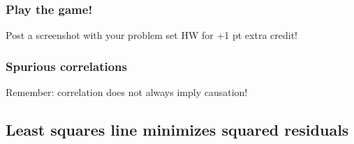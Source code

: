 \documentclass[11pt,containsverbatim,handout,xcolor=xelatex,dvipsnames,table]{beamer}
\begin{document}

\begin{frame}
\frametitle{Play the game!}

\vfill

Post a screenshot with your problem set HW for +1 pt extra credit!


\vfill

\end{frame}


\begin{frame}
\frametitle{Spurious correlations}

\vfill

Remember: correlation does not always imply causation!


\vfill

\end{frame}


\subsection{Least squares line minimizes squared residuals}
\label{mi2}

\end{document}
